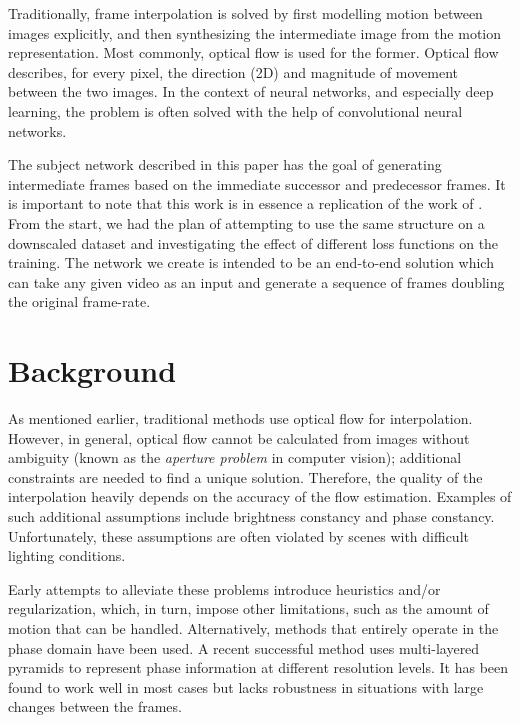\documentclass[10pt,twocolumn,letterpaper]{article}
\begin{document}
Traditionally, frame interpolation is solved by first modelling motion between images explicitly, and then synthesizing the intermediate image from the motion representation. Most commonly, optical flow is used for the former. Optical flow describes, for every pixel, the direction (2D) and magnitude of movement between the two images.
In the context of neural networks, and especially deep learning, the problem is often solved with the help of convolutional neural networks.

The subject network described in this paper has the goal of generating intermediate frames based on the immediate successor and predecessor frames.
It is important to note that this work is in essence a replication of the work of \citeauthor{SepConv}. From the start, we had the plan of attempting to use the same structure on a downscaled dataset and investigating the effect of different loss functions on the training.
The network we create is intended to be an end-to-end solution which can take any given video as an input and generate a sequence of frames doubling the original frame-rate.


\section{Background}
\label{sec:related_work}
As mentioned earlier, traditional methods use optical flow for interpolation. However, in general, optical flow cannot be calculated from images without ambiguity (known as the \textit{aperture problem} in computer vision); additional constraints are needed to find a unique solution. Therefore, the quality of the interpolation heavily depends on the accuracy of the flow estimation. Examples of such additional assumptions include brightness constancy and phase constancy. Unfortunately, these assumptions are often violated by scenes with difficult lighting conditions.

Early attempts to alleviate these problems introduce heuristics and/or regularization, which, in turn, impose other limitations, such as the amount of motion that can be handled. Alternatively, methods that entirely operate in the phase domain have been used. A recent successful method \cite{PhaseBased} uses multi-layered pyramids to represent phase information at different resolution levels. It has been found to work well in most cases but lacks robustness in situations with large changes between the frames.
\end{document}
